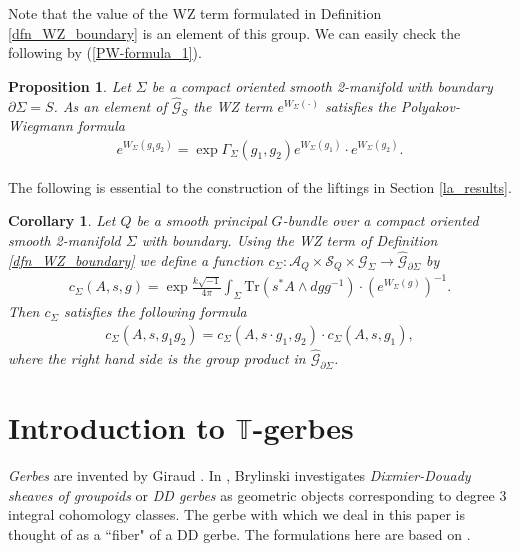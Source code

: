 \documentclass[a4paper,a4paper]{article}
\newtheorem{prop}[thm]{Proposition}
\newtheorem{cor}[thm]{Corollary}
\theoremstyle{definition}
\theoremstyle{remark}
\newcommand{\T}{\mathbb{T}}
\newcommand{\A}{\mathcal{A}}
\newcommand{\G}{\mathcal{G}}
\newcommand{\Tr}{\mathrm{Tr}}
\renewcommand{\S}{\mathcal{S}}
\def\h#1{ \widehat{#1} }
\begin{document}
Note that the value of the WZ term formulated in Definition \ref{dfn_WZ_boundary} is an element of this group. We can easily check the following by (\ref{PW-formula_1}).

\begin{prop}
Let $\Sigma$ be a compact oriented smooth 2-manifold with boundary $\partial \Sigma = S$. As an element of $\h{\G}_S$ the WZ term $e^{ W_\Sigma (\cdot) }$ satisfies the Polyakov-Wiegmann formula
\begin{eqnarray}
e^{ W_\Sigma(g_1 g_2) } = 
\exp \Gamma_\Sigma(g_1,g_2) e^{ W_\Sigma(g_1) } \cdot e^{ W_\Sigma(g_2) } .
\label{PW-formula_2}
\end{eqnarray}
\end{prop}

The following is essential to the construction of the liftings in Section \ref{la_results}.

\begin{cor}
Let $Q$ be a smooth principal $G$-bundle over a compact oriented smooth 2-manifold $\Sigma$ with boundary. Using the WZ term of Definition \ref{dfn_WZ_boundary} we define a function $c_\Sigma : \A_Q \times \S_Q \times \G_\Sigma \to \h{\G}_{\partial \Sigma}$ by
\begin{eqnarray}
c_\Sigma(A,s,g) = 
\exp \frac{k\sqrt{-1}}{4\pi} \int_\Sigma \Tr(s^*A \wedge dgg^{-1}) \cdot \left( e^{W_\Sigma(g)} \right)^{-1} .
\label{cocycle_3}
\end{eqnarray}
Then $c_\Sigma$ satisfies the following formula
\begin{eqnarray}
c_\Sigma(A,s,g_1 g_2) = c_\Sigma(A,s \cdot g_1,g_2) \cdot c_\Sigma(A,s,g_1) ,
\label{cocycle_condition_3}
\end{eqnarray}
where the right hand side is the group product in $\h{\G}_{\partial \Sigma}$.
\end{cor}



\section{Introduction to $\T$-gerbes}
\label{la_intro_gerbe}

\textit{Gerbes} are invented by Giraud \cite{Gi}. In \cite{Br1}, Brylinski investigates \textit{Dixmier-Douady sheaves of groupoids} or \textit{DD gerbes} as geometric objects corresponding to degree 3 integral cohomology classes. The gerbe with which we deal in this paper is thought of as a ``fiber" of a DD gerbe. The formulations here are based on \cite{F2}. 
\end{document}
